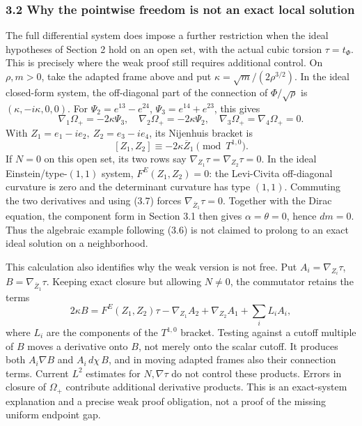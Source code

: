 \documentclass[
  10pt,
]{article}
\begin{document}
\hypertarget{why-the-pointwise-freedom-is-not-an-exact-local-solution}{%
\subsubsection{3.2 Why the pointwise freedom is not an exact local
solution}\label{why-the-pointwise-freedom-is-not-an-exact-local-solution}}

The full differential system does impose a further restriction when the
ideal hypotheses of Section 2 hold on an open set, with the actual cubic
torsion \(\tau=t_\Phi\). This is precisely where the weak proof still
requires additional control. On \(\rho,m>0\), take the adapted frame
above and put \(\kappa=\sqrt m/(2\rho^{3/2})\). In the ideal closed-form
system, the off-diagonal part of the connection of \(\Phi/\sqrt\rho\) is
\((\kappa,-i\kappa,0,0)\). For \(\Psi_2=e^{13}-e^{24}\),
\(\Psi_3=e^{14}+e^{23}\), this gives \[
 \nabla_1\Omega_+=-2\kappa\Psi_3,\quad
 \nabla_2\Omega_+=-2\kappa\Psi_2,\quad
 \nabla_3\Omega_+=\nabla_4\Omega_+=0.
\] With \(Z_1=e_1-ie_2,\ Z_2=e_3-ie_4\), its Nijenhuis bracket is \[
       [Z_1,Z_2]\equiv-2\kappa\overline Z_1
                                      \pmod{T^{1,0}}.          \tag{3.7}
\] If \(N=0\) on this open set, its two rows say
\(\nabla_{Z_1}\tau=\nabla_{Z_2}\tau=0\). In the ideal
Einstein/type-\((1,1)\) system, \(F^E(Z_1,Z_2)=0\): the Levi-Civita
off-diagonal curvature is zero and the determinant curvature has type
\((1,1)\). Commuting the two derivatives and using (3.7) forces
\(\nabla_{\overline Z_1}\tau=0\). Together with the Dirac equation, the
component form in Section 3.1 then gives \(\alpha=\theta=0\), hence
\(dm=0\). Thus the algebraic example following (3.6) is not claimed to
prolong to an exact ideal solution on a neighborhood.

This calculation also identifies why the weak version is not free. Put
\(A_i=\nabla_{Z_i}\tau\), \(B=\nabla_{\overline Z_1}\tau\). Keeping
exact closure but allowing \(N\ne0\), the commutator retains the terms
\[
 2\kappa B
   =F^E(Z_1,Z_2)\tau-\nabla_{Z_1}A_2+\nabla_{Z_2}A_1
                                      +\sum_i L_iA_i,         \tag{3.8}
\] where \(L_i\) are the components of the \(T^{1,0}\) bracket. Testing
against a cutoff multiple of \(B\) moves a derivative onto \(B\), not
merely onto the scalar cutoff. It produces both \(A_i\nabla B\) and
\(A_i\,d\chi\,B\), and in moving adapted frames also their connection
terms. Current \(L^2\) estimates for \(N,\nabla\tau\) do not control
these products. Errors in closure of \(\Omega_+\) contribute additional
derivative products. This is an exact-system explanation and a precise
weak proof obligation, not a proof of the missing uniform endpoint gap.
\end{document}
